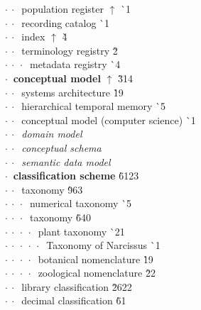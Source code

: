 \begin{tabbing}
$\cdot\:\cdot\:$  population register $\uparrow$ \` {\raisebox{.4\height}{\scalebox{.6}{+}}}1\\
$\cdot\:\cdot\:$  recording catalog  \` {\raisebox{.4\height}{\scalebox{.6}{+}}}1\\
$\cdot\:\cdot\:$  index $\uparrow$ \` 4\\
$\cdot\:\cdot\:$  terminology registry  \` 2\\
$\cdot\:\cdot\:\cdot\:$  metadata registry  \` {\raisebox{.4\height}{\scalebox{.6}{+}}}4\\
$\cdot\:$  \textbf{conceptual model} $\uparrow$ \` 3{\raisebox{.4\height}{\scalebox{.6}{+}}}14\\
$\cdot\:\cdot\:$  systems architecture  \` 1{\raisebox{.4\height}{\scalebox{.6}{+}}}9\\
$\cdot\:\cdot\:$  hierarchical temporal memory  \` {\raisebox{.4\height}{\scalebox{.6}{+}}}5\\
$\cdot\:\cdot\:$  conceptual model (computer science)  \` {\raisebox{.4\height}{\scalebox{.6}{+}}}1\\
$\cdot\:\cdot\:$  \textit{domain model}\\
$\cdot\:\cdot\:$  \textit{conceptual schema}\\
$\cdot\:\cdot\:$  \textit{semantic data model}\\
$\cdot\:$  \textbf{classification scheme}  \` 61{\raisebox{.4\height}{\scalebox{.6}{+}}}23\\
$\cdot\:\cdot\:$  taxonomy  \` 9{\raisebox{.4\height}{\scalebox{.6}{+}}}63\\
$\cdot\:\cdot\:\cdot\:$  numerical taxonomy  \` {\raisebox{.4\height}{\scalebox{.6}{+}}}5\\
$\cdot\:\cdot\:\cdot\:$  taxonomy  \` 6{\raisebox{.4\height}{\scalebox{.6}{+}}}40\\
$\cdot\:\cdot\:\cdot\:\cdot\:$  plant taxonomy  \` {\raisebox{.4\height}{\scalebox{.6}{+}}}21\\
$\cdot\:\cdot\:\cdot\:\cdot\:\cdot\:$  Taxonomy of Narcissus  \` {\raisebox{.4\height}{\scalebox{.6}{+}}}1\\
$\cdot\:\cdot\:\cdot\:\cdot\:$  botanical nomenclature  \` 1{\raisebox{.4\height}{\scalebox{.6}{+}}}9\\
$\cdot\:\cdot\:\cdot\:\cdot\:$  zoological nomenclature  \` 2{\raisebox{.4\height}{\scalebox{.6}{+}}}2\\
$\cdot\:\cdot\:$  library classification  \` 26{\raisebox{.4\height}{\scalebox{.6}{+}}}22\\
$\cdot\:\cdot\:$  decimal classification  \` 6{\raisebox{.4\height}{\scalebox{.6}{+}}}1\\

\end{tabbing}
